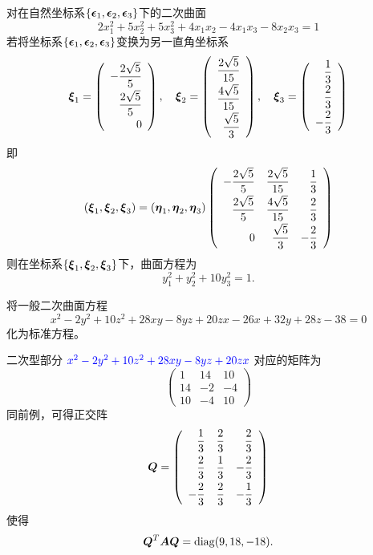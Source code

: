 \begin{frame}
  
    对在自然坐标系$\{\boldsymbol{\epsilon}_1,\boldsymbol{\epsilon}_2,\boldsymbol{\epsilon}_3\}$下的二次曲面
    $$
    2x_1^2+5x_2^2+5x_3^2+4x_1x_2-4x_1x_3-8x_2x_3=1
    $$ \pause
    若将坐标系$\{\boldsymbol{\epsilon}_1,\boldsymbol{\epsilon}_2,\boldsymbol{\epsilon}_3\}$变换为另一直角坐标系
    $$
    \boldsymbol{\xi}_1=\left(
    \begin{array}{r}
      \displaystyle-\frac{2\sqrt{5}}5\\[0.2cm]
      \displaystyle \frac{2\sqrt{5}}5\\[0.2cm]
      \displaystyle 0
    \end{array}
    \right), \quad
    \boldsymbol{\xi}_2=\left(
    \begin{array}{r}
      \displaystyle\frac{2\sqrt{5}}{15}\\[0.2cm]
      \displaystyle\frac{4\sqrt{5}}{15}\\[0.2cm]
      \displaystyle\frac{\sqrt{5}}3
    \end{array}
    \right),\quad
    \boldsymbol{\xi}_3=\left(
    \begin{array}{r}
      \displaystyle\frac13\\[0.2cm]
      \displaystyle\frac23\\[0.2cm]
      \displaystyle-\frac23
    \end{array}
    \right)
    $$\pause
    即
    $$
    (\boldsymbol{\xi}_1,\boldsymbol{\xi}_2,\boldsymbol{\xi}_3)=(\boldsymbol{\eta}_1,\boldsymbol{\eta}_2,\boldsymbol{\eta}_3)\left(
    \begin{array}{rrr}
      \displaystyle-\frac{2\sqrt{5}}5&\displaystyle\frac{2\sqrt{5}}{15}&\displaystyle\frac13\\[0.2cm]
      \displaystyle \frac{2\sqrt{5}}5&\displaystyle\frac{4\sqrt{5}}{15}&\displaystyle\frac23\\[0.2cm]
      \displaystyle 0&\displaystyle\frac{\sqrt{5}}3&\displaystyle-\frac23
    \end{array}
    \right)
    $$\pause
    则在坐标系$\{\boldsymbol{\xi}_1,\boldsymbol{\xi}_2,\boldsymbol{\xi}_3\}$下，曲面方程为
    $$
    y_1^2+y_2^2+10y_3^2=1.
    $$
  
\end{frame}


\begin{frame}
  
    \begin{li}
      将一般二次曲面方程
      $$
      x^2-2y^2+10z^2+28xy-8yz+20zx-26x+32y+28z-38=0
      $$
      化为标准方程。
    \end{li}
    \pause
    \begin{jie}
    二次型部分
    $
    \textcolor{blue}{x^2-2y^2+10z^2+28xy-8yz+20zx}
    $
    对应的矩阵为
    $$
    \left(
    \begin{array}{rrr}
      1&14&10\\
      14&-2&-4\\
      10&-4&10
    \end{array}
    \right)
    $$
    同前例，可得正交阵
    $$
    \boldsymbol{Q}=\left(
    \begin{array}{rrr}
      \displaystyle\frac13&\displaystyle\frac23&\displaystyle\frac23\\[0.1in]
      \displaystyle\frac23&\displaystyle\frac13&\displaystyle-\frac23\\[0.1in]
      \displaystyle-\frac23&\displaystyle\frac23&\displaystyle-\frac13
    \end{array}
    \right)
    $$
    使得
    $$
    \boldsymbol{Q}^T\boldsymbol{A}\boldsymbol{Q}=\mathrm{diag}(9,18,-18).
    $$
    \end{jie}
\end{frame}

